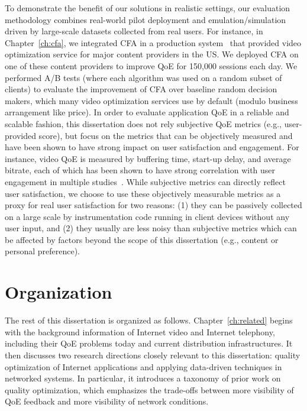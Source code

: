 \begin{itemize}
\end{itemize}


To demonstrate the benefit of our solutions in realistic settings, 
our evaluation methodology combines real-world pilot deployment and 
emulation/simulation driven by large-scale datasets collected from real  users.
For instance, in Chapter~\ref{ch:cfa}, we integrated CFA in a production 
system~\cite{c3} that provided video optimization service for major content
providers in the US.
We deployed CFA on one of these content providers to improve QoE for
150,000 sessions each day. We performed A/B tests (where each algorithm
was used on a random subset of clients) to evaluate
the improvement of CFA over baseline random decision
makers, which many video optimization services use 
by default (modulo business arrangement like price).
%
In order to evaluate application QoE in a reliable 
and scalable fashion, this dissertation does not rely subjective QoE 
metrics (e.g., user-provided score), but focus on the metrics that can be
objectively measured and 
have been shown to have strong impact on user satisfaction 
and engagement.
For instance, video QoE is measured by buffering time, start-up delay,
and average bitrate, each of which has been shown to have strong
correlation with user engagement in multiple 
studies~\cite{sigcomm11,akamai-imc12}.
While subjective metrics can directly reflect user satisfaction, we
choose to use these objectively measurable 
metrics as a proxy for real user satisfaction for two reasons:
(1) they can be passively collected on a large scale by instrumentation code 
running in client devices without any user input, and (2) they usually
are less noisy than subjective metrics which can be affected by factors
beyond the scope of this dissertation (e.g., content or personal preference).




\section{Organization}
The rest of this dissertation is organized as follows.
Chapter~\ref{ch:related} begins with the background information of
Internet video and Internet telephony, including their QoE problems
today and current distribution infrastructures.
It then discusses two research directions closely 
relevant to this dissertation: 
quality optimization of Internet applications and applying data-driven 
techniques in networked systems.
In particular, it introduces a taxonomy of prior work on quality 
optimization, which emphasizes the trade-offs between 
more visibility of QoE feedback and more visibility of network
conditions.


